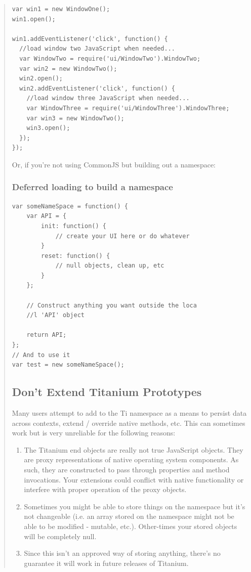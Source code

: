 \documentclass[11pt]{book}
\begin{document}
\begin{quotation}
\begin{lstlisting}[frame=single]
var win1 = new WindowOne();
win1.open();

win1.addEventListener('click', function() {
  //load window two JavaScript when needed...
  var WindowTwo = require('ui/WindowTwo').WindowTwo;
  var win2 = new WindowTwo();
  win2.open();
  win2.addEventListener('click', function() {
    //load window three JavaScript when needed...
    var WindowThree = require('ui/WindowThree').WindowThree;
    var win3 = new WindowTwo();
    win3.open();
  });
});
\end{lstlisting}

Or, if you're not using CommonJS but building out a namespace:
\subsubsection{Deferred loading to build a namespace}
\begin{lstlisting}[frame=single]
var someNameSpace = function() {
    var API = {
        init: function() {
            // create your UI here or do whatever
        }
        reset: function() {
            // null objects, clean up, etc
        }
    };

    // Construct anything you want outside the loca
    //l 'API' object

    return API;
};
// And to use it
var test = new someNameSpace();
\end{lstlisting}

\subsection{Don't Extend Titanium Prototypes}
Many users attempt to add to the Ti namespace as a means to persist data across contexts, extend / override native methods, etc. This can sometimes work but is very unreliable for the following reasons:
\begin{enumerate}
    \item The Titanium end objects are really not true JavaScript objects. They are proxy representations of native operating system components. As such, they are constructed to pass through properties and method invocations. Your extensions could conflict with native functionality or interfere with proper operation of the proxy objects.
    \item Sometimes you might be able to store things on the namespace but it's not changeable (i.e. an array stored on the namespace might not be able to be modified - mutable, etc.). Other-times your stored objects will be completely null.
    \item Since this isn't an approved way of storing anything, there's no guarantee it will work in future releases of Titanium.
\end{enumerate}


\end{quotation}
\end{document}

